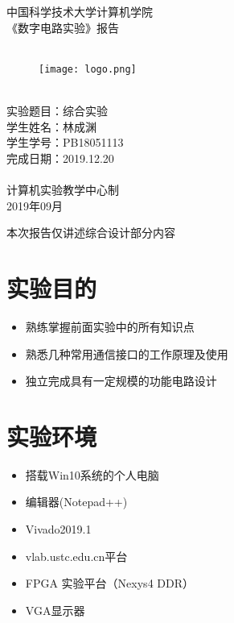\documentclass[lang=cn,11pt,a4paper]{elegantpaper}
\begin{document}
\begin{center} 
	 中国科学技术大学计算机学院\\
	 《数字电路实验》报告\\
	\ \\

\begin{figure}[H]
	\centering
	\texttt{[image: logo.png]}
\end{figure}

	 \ \\
			  实验题目：综合实验\\
			  学生姓名：林成渊\\
			  学生学号：PB18051113\\
			  完成日期：2019.12.20\\
			  \ \\
	 计算机实验教学中心制\\
			  2019年09月
	
\end{center}

\begin{center}
	本次报告仅讲述综合设计部分内容
\end{center}

\section{实验目的}

\begin{itemize}
	\item 熟练掌握前面实验中的所有知识点
	\item 熟悉几种常用通信接口的工作原理及使用 
	\item 独立完成具有一定规模的功能电路设计
\end{itemize}

\section{实验环境}

\begin{itemize}
	\item 搭载Win10系统的个人电脑
	\item 编辑器(Notepad++)
	\item Vivado2019.1
	\item vlab.ustc.edu.cn平台
	\item FPGA 实验平台（Nexys4 DDR）
	\item VGA显示器
\end{itemize}
\end{document}
